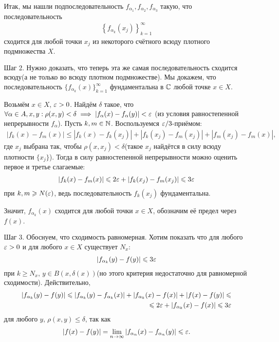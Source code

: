\documentclass[../complex-analysis.tex]{subfiles}
\begin{document}
Итак, мы нашли подпоследовательность $ f_{\alpha_1}, f_{\alpha_2}, f_{\alpha_3} $ такую, что последовательность
\begin{align*}
 \left\{f_{\alpha_{k}}(x_j) \right\}_{k=1}^{\infty}
\end{align*} сходится для любой точки $ x_j $ из некоторого счётного всюду плотного подмножества $ X $.

Шаг 2. Нужно доказать, что теперь эта же самая последовательность сходится всюду(а не только во всюду плотном подмножестве). Мы докажем, что последовательность $ \{f_{\alpha_k}(x)\}_{k=1}^{\infty}   $ фундаментальна в $ \mathbb{C} $ любой точке $ x \in X $.

Возьмём $ x \in X $, $ \varepsilon > 0 $. Найдём $ \delta $ такое, что $\forall \alpha \in A, x, y : \rho(x, y) < \delta \implies | f_\alpha(x) - f_\alpha(y)| < \varepsilon$ (из условия равностепенной непрерывности $f_\alpha$). Пусть $ k, m \in \mathbb{N} $. Воспользуемся $ \varepsilon / 3 $-приёмом:
\begin{align*}
 \left| f_{k}(x) - f_{m}(x) \right|\leqslant \left| f_k(x) - f_k(x_j) \right| + \left| f_k(x_j) - f_m(x_j) \right| + \left| f_m(x_j) - f_m(x) \right|,
\end{align*} где $ x_j $ выбрана так, чтобы $ \rho(x, x_j) < \delta $(такое $x_j$ найдётся в силу всюду плотности $\{ x_j\}$). Тогда в силу равностепенной непрерывности можно оценить первое и третье слагаемые:
\begin{align*}
 \left| f_k(x)-f_m(x) \right| \leqslant 2\varepsilon + \left| f_k(x_j) - f_m(x_j) \right| \leqslant 3\varepsilon
\end{align*} при $ k, m \geqslant N(\varepsilon) $, ведь последовательность $ f_k(x_j) $ фундаментальна.

Значит, $ f_{\alpha_k}(x) $ сходится для любой точки $ x \in X $, обозначим её предел через $ f(x) $.

Шаг 3. Обоснуем, что сходимость равномерная. Хотим показать что для любого $ \varepsilon > 0 $ и для любого $ x \in X $ существует $ N_x $:
\begin{align*}
 \left|f_{\alpha_k}(y) - f(y) \right| \leqslant 3\varepsilon
\end{align*} при $ k \geqslant N_x $, $ y \in B(x, \delta(x)) $(но этого критерия недостаточно для равномерной сходимости). Действительно,
\begin{align*}
 \left| f_{\alpha_k}(y) - f(y) \right| \leqslant \left| f_{\alpha_k}(y) - f_{\alpha_k}(x) \right| + \left| f_{\alpha_k}(x) - f(x) \right| + \left| f(x) - f(y) \right| \leqslant \\ \leqslant 2\varepsilon + \left| f_{\alpha_k}(x) - f(x) \right| \leqslant 3\varepsilon
\end{align*}  для любого $ y $, $ \rho(x, y) \leqslant \delta $, так как
\begin{align*}
 \left| f(x) - f(y) \right| = \lim_{n \to \infty} \left|f_{\alpha_n}(x) - f_{\alpha_n}(y) \right| \leqslant \varepsilon.
\end{align*} 
\end{document}
